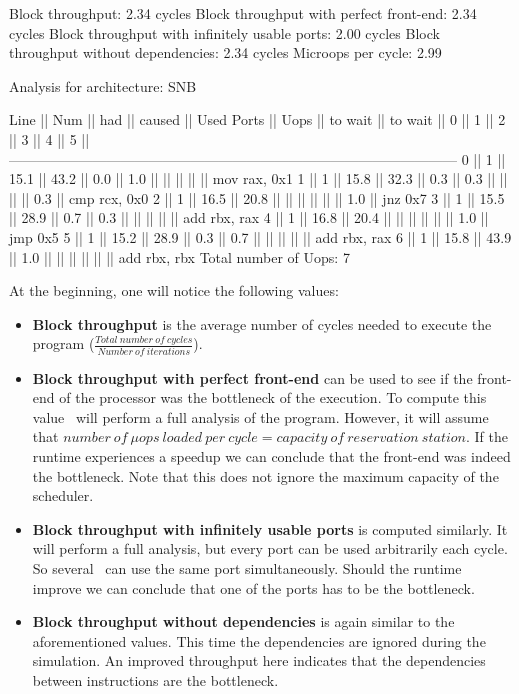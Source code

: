 \begin{example}
    Block throughput: 2.34 cycles
    Block throughput with perfect front-end: 2.34 cycles
    Block throughput with infinitely usable ports: 2.00 cycles
    Block throughput without dependencies: 2.34 cycles
    Microops per cycle: 2.99
    
    Analysis for architecture: SNB
    
     Line  ||   Num   ||   had   || caused  ||            Used Ports
           ||   Uops  || to wait || to wait ||   0   ||   1   ||   2   ||   3   ||   4   ||   5   ||
    ------------------------------------------------------------------------------------------------
       0   ||    1    ||  15.1   ||  43.2   ||  0.0  ||  1.0  ||       ||       ||       ||       || mov rax, 0x1
       1   ||    1    ||  15.8   ||  32.3   ||  0.3  ||  0.3  ||       ||       ||       ||  0.3  || cmp rcx, 0x0
       2   ||    1    ||  16.5   ||  20.8   ||       ||       ||       ||       ||       ||  1.0  || jnz 0x7
       3   ||    1    ||  15.5   ||  28.9   ||  0.7  ||  0.3  ||       ||       ||       ||       || add rbx, rax
       4   ||    1    ||  16.8   ||  20.4   ||       ||       ||       ||       ||       ||  1.0  || jmp 0x5
       5   ||    1    ||  15.2   ||  28.9   ||  0.3  ||  0.7  ||       ||       ||       ||       || add rbx, rax
       6   ||    1    ||  15.8   ||  43.9   ||  1.0  ||       ||       ||       ||       ||       || add rbx, rbx
    Total number of Uops: 7
\end{example}




At the beginning, one will notice the following values:
\begin{itemize}
    \item \textbf{Block throughput} is the average number of cycles needed to execute the program ($\frac{Total\ number\ of\ cycles}{Number\ of\ iterations}$).
    \item \textbf{Block throughput with perfect front-end} can be used to see if the front-end of the processor was the bottleneck of the execution. To compute this value \suaca\ will perform a full analysis of the program. However, it will assume that $number\ of\ \mu ops\ loaded\ per\ cycle = capacity\ of\ reservation\ station$. If the runtime experiences a speedup we can conclude that the front-end was indeed the bottleneck. Note that this does not ignore the maximum capacity of the scheduler.
    \item \textbf{Block throughput with infinitely usable ports} is computed similarly. It will perform a full analysis, but every port can be used arbitrarily each cycle. So several \microops\ can use the same port simultaneously. Should the runtime improve we can conclude that one of the ports has to be the bottleneck.
    \item \textbf{Block throughput without dependencies} is again similar to the aforementioned values. This time the dependencies are ignored during the simulation. An improved throughput here indicates that the dependencies between instructions are the bottleneck. 
\end{itemize}

